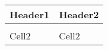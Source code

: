 \documentclass{article}
\begin{document}
             \begin{tabu}{XX}
               \rowfont{\bfseries\itshape\large} Header1 & Header2 \\
                   \hline \\
                    Cell2 & Cell2 \\
              \end{tabu}
\end{document}
